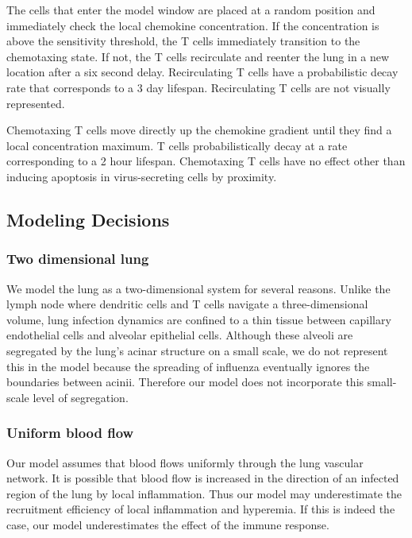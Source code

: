 \documentclass[10pt]{article}
\begin{document}
The cells that enter the model window are placed at a random position and immediately check the local chemokine concentration.  If the concentration is above the sensitivity threshold, the T cells immediately transition to the chemotaxing state.  If not, the T cells recirculate and reenter the lung in a new location after a six second delay.  Recirculating T cells have a probabilistic decay rate that corresponds to a 3 day lifespan.  Recirculating T cells are not visually represented.  

Chemotaxing T cells move directly up the chemokine gradient until they find a local concentration maximum.  T cells probabilistically decay at a rate corresponding to a 2 hour lifespan.  Chemotaxing T cells have no effect other than inducing apoptosis in virus-secreting cells by proximity.


\subsection{Modeling Decisions}

\subsubsection{Two dimensional lung}

We model the lung as a two-dimensional system for several reasons.  Unlike the lymph node where dendritic cells and T cells navigate a three-dimensional volume, lung infection dynamics are confined to a thin tissue between capillary endothelial cells and alveolar epithelial cells.  Although these alveoli are segregated by the lung's acinar structure on a small scale, we do not represent this in the model because the spreading of influenza eventually ignores the boundaries between acinii.  Therefore our model does not incorporate this small-scale level of segregation.

\subsubsection{Uniform blood flow}

Our model assumes that blood flows uniformly through the lung vascular network.  It is possible that blood flow is increased in the direction of an infected region of the lung by local inflammation.  Thus our model may underestimate the recruitment efficiency of local inflammation and hyperemia.  If this is indeed the case, our model underestimates the effect of the immune response.
\end{document}
